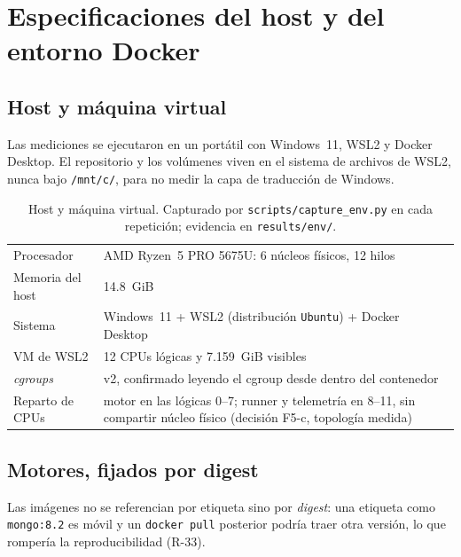
\section{Especificaciones del host y del entorno Docker}
\label{sec:entorno}

\subsection{Host y máquina virtual}

Las mediciones se ejecutaron en un portátil con Windows~11, WSL2 y Docker
Desktop. El repositorio y los volúmenes viven en el sistema de archivos de WSL2,
nunca bajo \texttt{/mnt/c/}, para no medir la capa de traducción de Windows.

\begin{table}[htbp]
  \centering
  \caption{Host y máquina virtual. Capturado por \texttt{scripts/capture\_env.py}
           en cada repetición; evidencia en \texttt{results/env/}.}
  \label{tab:host}
  \small
  \begin{tabularx}{\linewidth}{lX}
    \toprule
    Procesador & AMD Ryzen~5 PRO 5675U: 6 núcleos físicos, 12 hilos \\
    Memoria del host & 14.8~GiB \\
    Sistema & Windows~11 + WSL2 (distribución \texttt{Ubuntu}) + Docker Desktop \\
    VM de WSL2 & 12 CPUs lógicas y 7.159~GiB visibles \\
    \emph{cgroups} & v2, confirmado leyendo el cgroup desde dentro del contenedor \\
    Reparto de CPUs & motor en las lógicas 0--7; runner y telemetría en 8--11, sin
                      compartir núcleo físico (decisión F5-c, topología medida) \\
    \bottomrule
  \end{tabularx}
\end{table}

\subsection{Motores, fijados por digest}

Las imágenes no se referencian por etiqueta sino por \emph{digest}: una etiqueta
como \texttt{mongo:8.2} es móvil y un \texttt{docker pull} posterior podría traer
otra versión, lo que rompería la reproducibilidad (R-33).

